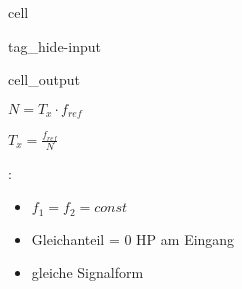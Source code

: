 \documentclass[letterpaper,10pt,english]{jupyterBook}
\begin{document}
\begin{sphinxuseclass}{cell}
\begin{sphinxuseclass}{tag_hide-input}\begin{sphinxVerbatimOutput}

\begin{sphinxuseclass}{cell_output}
\noindent{}

\end{sphinxuseclass}\end{sphinxVerbatimOutput}

\end{sphinxuseclass}
\end{sphinxuseclass}
\begin{DUlineblock}{0em}
\item[] 
\end{DUlineblock}

\sphinxAtStartPar
{}

\begin{DUlineblock}{0em}
\item[] 
\end{DUlineblock}

\sphinxAtStartPar
\(N = T_x \cdot f_{ref}\)

\sphinxAtStartPar
\(T_x = \frac{f_{ref}}{N}\)

\begin{DUlineblock}{0em}
\item[] 
\end{DUlineblock}

\sphinxAtStartPar
{}:
\begin{itemize}
\item {} 
\sphinxAtStartPar
\(f_1 = f_2 = const\)

\item {} 
\sphinxAtStartPar
Gleichanteil = 0
HP am Eingang

\item {} 
\sphinxAtStartPar
gleiche Signalform

\end{itemize}

\begin{DUlineblock}{0em}
\item[] 
\end{DUlineblock}
\end{document}

